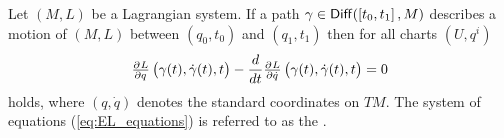 \begin{theorem}
	\label{thm:EL_equations}
	Let $(M,L)$ be a Lagrangian system. If a path $\gamma \in \mathsf{Diff}(\intcc[0]{t_0,t_1},M)$ describes a motion of $(M,L)$ between $(q_0,t_0)$ and $(q_1,t_1)$ then for all charts $(U,q^i)$
	\begin{equation}
		\label{eq:EL_equations}
		\pd{L}{q}\del[1]{\gamma(t),\dot{\gamma}(t),t} - \frac{d}{dt} \pd{L}{\dot{q}}\del[1]{\gamma(t),\dot{\gamma}(t),t} = 0
	\end{equation}
	\noindent holds, where $(q,\dot{q})$ denotes the standard coordinates on $TM$. The system of equations \textup{(}\ref{eq:EL_equations}\textup{)} is referred to as the .
\end{theorem}

